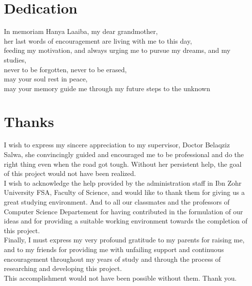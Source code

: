 

\chapter*{Dedication}
\thispagestyle{empty}
%
\vspace*{\fill}

\begin{center}
  In memoriam Hanya Laaiba, my dear grandmother, ~ \\
  her last words of encouragement are living with me to this day, ~ \\
  feeding my motivation, and always urging me to pursue my dreams, and my studies, ~\\
  never to be forgotten, never to be erased, ~ \\
  may your soul rest in peace, ~ \\
  may your memory guide me through my future steps to the unknown ~ \\


\end{center}
%
\vspace*{\fill}

%
%
%
%
%
%
\cleardoublepage%
\chapter*{Thanks}
\thispagestyle{empty}
%

I wish to express my sincere appreciation to my supervisor, Doctor Belaqziz Salwa, she convincingly guided and encouraged me to be professional and do the right thing even when the road got tough. Without her persistent help, the goal of this project would not have been realized.\\
I wish to acknowledge the help provided by the administration staff in Ibn Zohr University \ac{FSA}, Faculty of Science, and would like to thank them for giving us a great studying environment. And to all our classmates and the professors of Computer Science Departement for having contributed in the formulation of our ideas and for providing a suitable working environment towards the completion of this project.\\
Finally, I must express my very profound gratitude to my parents for raising me, and to my friends for providing me with unfailing support and continuous encouragement throughout my years of study and through the process of researching and developing this project. \\
This accomplishment would not have been possible without them. Thank you.

